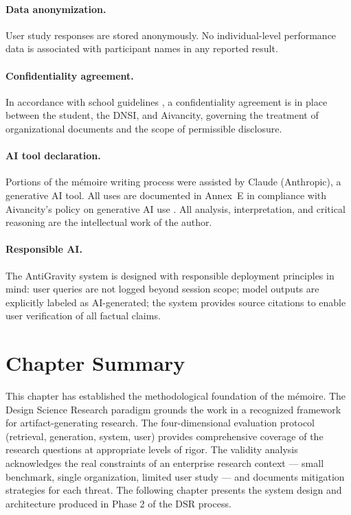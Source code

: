 \paragraph{Data anonymization.} User study responses are stored anonymously. No individual-level performance data is associated with participant names in any reported result.

\paragraph{Confidentiality agreement.} In accordance with school guidelines \citep{AivancityGuide2025}, a confidentiality agreement is in place between the student, the DNSI, and Aivancity, governing the treatment of organizational documents and the scope of permissible disclosure.

\paragraph{AI tool declaration.} Portions of the mémoire writing process were assisted by Claude (Anthropic), a generative AI tool. All uses are documented in Annex~E in compliance with Aivancity's policy on generative AI use \citep{AivancityGuide2025}. All analysis, interpretation, and critical reasoning are the intellectual work of the author.

\paragraph{Responsible AI.} The AntiGravity system is designed with responsible deployment principles in mind: user queries are not logged beyond session scope; model outputs are explicitly labeled as AI-generated; the system provides source citations to enable user verification of all factual claims.

\section{Chapter Summary}
\label{sec:method-summary}

This chapter has established the methodological foundation of the mémoire. The Design Science Research paradigm grounds the work in a recognized framework for artifact-generating research. The four-dimensional evaluation protocol (retrieval, generation, system, user) provides comprehensive coverage of the research questions at appropriate levels of rigor. The validity analysis acknowledges the real constraints of an enterprise research context — small benchmark, single organization, limited user study — and documents mitigation strategies for each threat. The following chapter presents the system design and architecture produced in Phase 2 of the DSR process.
